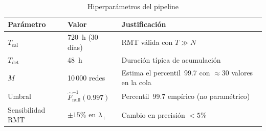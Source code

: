 \begin{table}[htbp]
  \caption{Hiperparámetros del pipeline}
  \label{tab:hyperparams}
  \centering
  \begin{tabular}{lll}
    \hline
    \textbf{Parámetro} & \textbf{Valor} & \textbf{Justificación} \\
    \hline
    $T_{\text{cal}}$ & 720~h (30 días) & RMT válida con $T \gg N$ \\
    $T_{\text{det}}$ & 48~h & Duración típica de acumulación~\cite{lamorgia2020} \\
    $M$ & 10\,000 redes & Estima el percentil~99.7 con ${\approx}30$ valores en la cola \\
    Umbral & $\hat{F}_{\text{null}}^{-1}(0.997)$ & Percentil~99.7 empírico (no paramétrico) \\
    Sensibilidad RMT & ${\pm}15\%$ en $\lambda_+$ & Cambio en precisión $< 5\%$ \\
    \hline
  \end{tabular}
\end{table}
